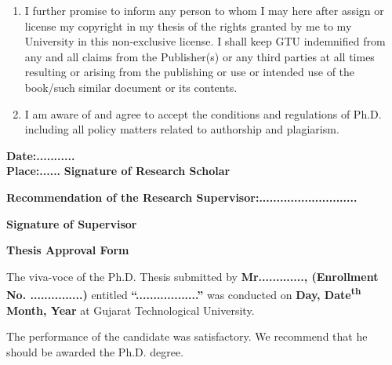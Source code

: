 \begin{enumerate} [label=\alph*.]
	\item I further promise to inform any person to whom I may here after assign or license my copyright in my thesis of the rights granted by me to my University in this non-exclusive license. I shall keep GTU indemnified from any and all claims from the Publisher(s) or any third parties at all times resulting or arising from the publishing or use or intended use of the book/such similar document or its contents.
	\item I am aware of and agree to accept the conditions and regulations of Ph.D. including all policy matters related to authorship and plagiarism.
\end{enumerate}

\vspace{1cm}

\textbf{Date:...........}\\
\textbf{Place:......}  \hspace{5cm}  \textbf{Signature of Research Scholar}\\

\vspace{1cm}

\textbf{Recommendation of the Research Supervisor:............................}\\

\vspace{2cm}

\hspace{9cm}\textbf{Signature of Supervisor}




\newpage

\begin{center}
	\Large	\textbf{Thesis Approval Form}
\end{center}


The viva-voce of the Ph.D. Thesis submitted by \textbf{Mr............., (Enrollment No. ...............)} entitled \textbf{“..................”} was conducted on \textbf{Day, Date\textsuperscript{th} Month, Year} at Gujarat Technological University.

\vspace{0.5cm}

\fbox{\rule{0pt}{1em}\hspace{1em}} \hspace{0.5 cm} The performance of the candidate was satisfactory. We recommend that he should be awarded the Ph.D. degree.\\


